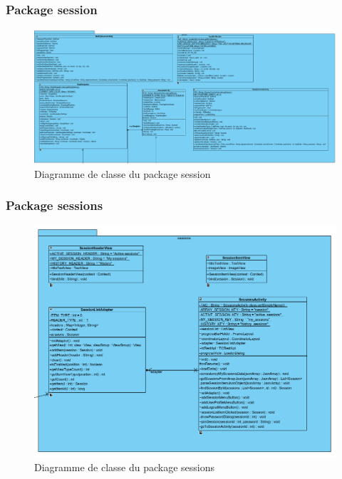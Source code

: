 \documentclass[titlepage, 12pt]{report}
\begin{document}
\clearpage

\subsubsection{Package session}

\begin{figure}[!h]
	\caption{Diagramme de classe du package session}
	\label{class_diagram_session}
	\centering
	\includegraphics[scale=0.3]{Images/diagram/package_session_diagram_class.png}
\end{figure}

\clearpage

\subsubsection{Package sessions}

\begin{figure}[!h]
	\caption{Diagramme de classe du package sessions}
	\label{class_diagram_sessions}
	\centering
	\includegraphics[scale=0.5]{Images/diagram/package_sessions_diagram_class.png}
\end{figure}
\end{document}
